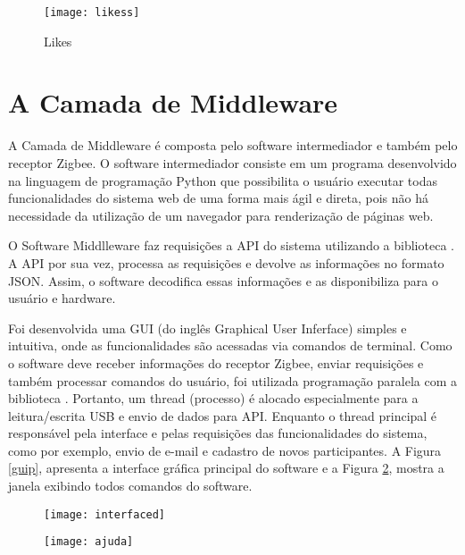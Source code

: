 \documentclass[tcc,capa]{texufpel}
\begin{document}
            \begin{figure}[H]
                \centering 
                \texttt{[image: likess]}
                \caption{Likes} 
                \label{likes}
            \end{figure}
    
     \section{A Camada de Middleware}
        
        A Camada de Middleware é composta pelo software intermediador e também pelo receptor Zigbee. O software intermediador consiste em um programa desenvolvido na linguagem de programação Python que possibilita o usuário executar todas funcionalidades do sistema web de uma forma mais ágil e direta, pois não há necessidade da utilização de um navegador para renderização de páginas web.
        
        O Software Middlleware faz requisições a API do sistema utilizando a biblioteca \cite{requests:2015:Online}. A API por sua vez, processa as requisições e devolve as informações no formato JSON. Assim, o software decodifica essas informações e as disponibiliza para o usuário e hardware.
        
        Foi desenvolvida uma GUI (do inglês Graphical User Inferface) simples e intuitiva, onde as funcionalidades são acessadas via comandos de terminal. Como o software deve receber informações do receptor Zigbee, enviar requisições e também processar comandos do usuário, foi utilizada programação paralela com a biblioteca \cite{threading:2015:Online}. Portanto, um thread (processo) é alocado especialmente para a leitura/escrita USB e envio de dados para API. Enquanto o thread principal é responsável pela interface e pelas requisições das funcionalidades do sistema, como por exemplo, envio de e-mail e cadastro de novos participantes.
        A Figura \ref{guip}, apresenta a interface gráfica principal do software e a Figura \ref{guip2}, mostra a janela exibindo todos comandos do software.
        
        \begin{figure}[H]
            \centering
            \begin{minipage}{.5\linewidth}
              \texttt{[image: interfaced]}
              \label{guip}
            \end{minipage}
            \hspace{.01\linewidth}
            \begin{minipage}{.45\linewidth}
              \texttt{[image: ajuda]}
              \label{guip2}
            \end{minipage}
        \end{figure}
    
\end{document}
